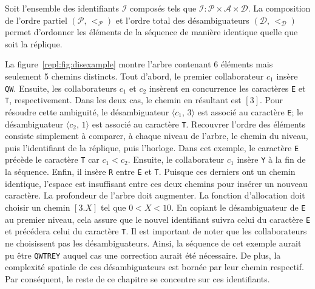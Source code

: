 Soit l'ensemble des identifiants $\mathcal{I}$ composés tels que
$\mathcal{I} : \mathcal{P} \times \mathcal{A} \times \mathcal{D}$. La
composition de l'ordre partiel $(\mathcal{P},\,<_\mathcal{P})$ et l'ordre total
des désambiguateurs $(\mathcal{D},\, <_\mathcal{D})$ permet d'ordonner les
éléments de la séquence de manière identique quelle que soit la réplique.

La figure~\ref{repl:fig:disexample} montre l'arbre contenant 6 éléments mais
seulement 5 chemins distincts. Tout d'abord, le premier collaborateur $c_1$
insère \texttt{QW}. Ensuite, les collaborateurs $c_1$ et $c_2$ insèrent en
concurrence les caractères \texttt{E} et \texttt{T}, respectivement. Dans les
deux cas, le chemin en résultant est $[3]$. Pour résoudre cette ambiguïté, le
désambiguateur $\langle c_1,\, 3 \rangle$ est associé au caractère \texttt{E};
le désambiguateur $\langle c_2,\, 1 \rangle$ est associé au caractère
\texttt{T}. Recouvrer l'ordre des éléments consiste simplement à comparer, à
chaque niveau de l'arbre, le chemin du niveau, puis l'identifiant de la
réplique, puis l'horloge. Dans cet exemple, le caractère \texttt{E} précède le
caractère \texttt{T} car $c_1< c_2$. Ensuite, le collaborateur $c_1$ insère
\texttt{Y} à la fin de la séquence. Enfin, il insère \texttt{R} entre \texttt{E}
et \texttt{T}. Puisque ces derniers ont un chemin identique, l'espace est
insuffisant entre ces deux chemins pour insérer un nouveau caractère. La
profondeur de l'arbre doit augmenter. La fonction d'allocation doit choisir un
chemin $[3.X]$ tel que $0<X<10$. En copiant le désambiguateur de \texttt{E} au
premier niveau, cela assure que le nouvel identifiant suivra celui du caractère
\texttt{E} et précédera celui du caractère \texttt{T}. Il est important de noter
que les collaborateurs ne choisissent pas les désambiguateurs. Ainsi, la
séquence de cet exemple aurait pu être \texttt{QWTREY} auquel cas une correction
aurait été nécessaire. De plus, la complexité spatiale de ces désambiguateurs
est bornée par leur chemin respectif. Par conséquent, le reste de ce chapitre se
concentre sur ces identifiants.


